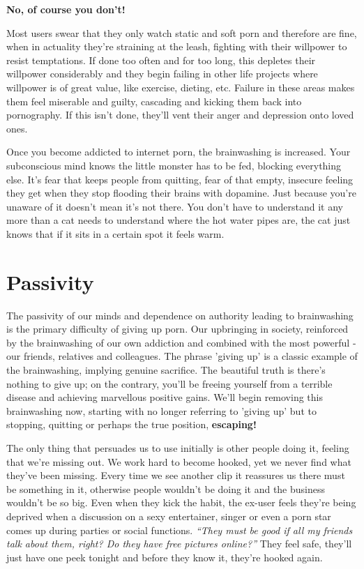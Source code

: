 \documentclass[
]{book}
\begin{document}
\textbf{No, of course you don't!}

Most users swear that they only watch static and soft porn and therefore are fine, when in actuality they're straining at the leash, fighting with their willpower to resist temptations. If done too often and for too long, this depletes their willpower considerably and they begin failing in other life projects where willpower is of great value, like exercise, dieting, etc. Failure in these areas makes them feel miserable and guilty, cascading and kicking them back into pornography. If this isn't done, they'll vent their anger and depression onto loved ones.

Once you become addicted to internet porn, the brainwashing is increased. Your subconscious mind knows the little monster has to be fed, blocking everything else. It's fear that keeps people from quitting, fear of that empty, insecure feeling they get when they stop flooding their brains with dopamine. Just because you're unaware of it doesn't mean it's not there. You don't have to understand it any more than a cat needs to understand where the hot water pipes are, the cat just knows that if it sits in a certain spot it feels warm.

\hypertarget{passivity}{%
\section{Passivity}\label{passivity}}

The passivity of our minds and dependence on authority leading to brainwashing is the primary difficulty of giving up porn. Our upbringing in society, reinforced by the brainwashing of our own addiction and combined with the most powerful - our friends, relatives and colleagues. The phrase 'giving up' is a classic example of the brainwashing, implying genuine sacrifice. The beautiful truth is there's nothing to give up; on the contrary, you'll be freeing yourself from a terrible disease and achieving marvellous positive gains. We'll begin removing this brainwashing now, starting with no longer referring to 'giving up' but to stopping, quitting or perhaps the true position, \textbf{escaping!}

The only thing that persuades us to use initially is other people doing it, feeling that we're missing out. We work hard to become hooked, yet we never find what they've been missing. Every time we see another clip it reassures us there must be something in it, otherwise people wouldn't be doing it and the business wouldn't be so big. Even when they kick the habit, the ex-user feels they're being deprived when a discussion on a sexy entertainer, singer or even a porn star comes up during parties or social functions. \emph{``They must be good if all my friends talk about them, right? Do they have free pictures online?''} They feel safe, they'll just have one peek tonight and before they know it, they're hooked again.
\end{document}
